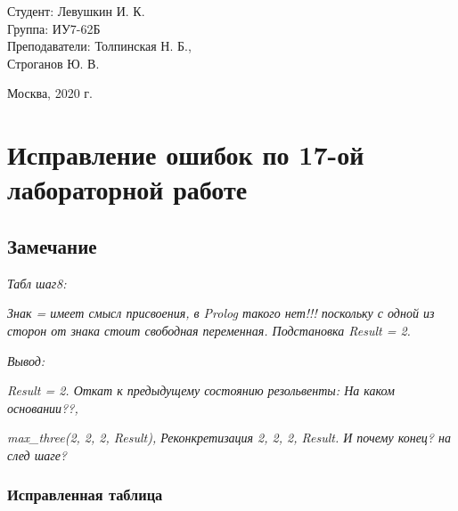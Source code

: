 \documentclass[a4paper,12pt]{article}
\begin{document}
	\vspace*{15mm} 	
	
	\large
	\begin{flushright}
		Студент: Левушкин И. К. \\
		Группа: ИУ7-62Б \\
		Преподаватели: Толпинская Н. Б., \\ Строганов Ю. В. \\
	\end{flushright}
	
	\vspace*{30mm}
	\begin{center}
		Москва, 2020 г.  
	\end{center}
	\thispagestyle{empty}
	
	\newpage
	
	
	\section*{Исправление ошибок по 17-ой лабораторной работе}
	
	\subsection*{Замечание}
	
	\textit{Табл  шаг8:}
	
	\textit{Знак = имеет смысл присвоения,  в Prolog такого нет!!! поскольку с одной из сторон от знака стоит свободная переменная. Подстановка Result = 2.}
	
	\textit{Вывод:}
	
	\textit{Result = 2. Откат к предыдущему	состоянию резольвенты: На каком основании??,}
	
	\textit{max\_three(2,	2,	2,
	Result),	Реконкретизация 2, 2, 2, Result. И почему конец? на след шаге?}
	
	\subsubsection*{Исправленная таблица}
	
\end{document}
